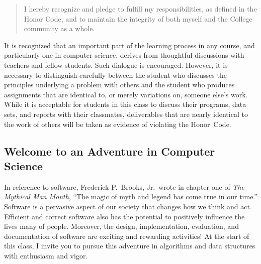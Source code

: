 \vspace*{-.1in}
\begin{quote}
  I hereby recognize and pledge to fulfill my responsibilities, as defined in the Honor Code, and to maintain the
  integrity of both myself and the College community as a whole.  
\end{quote}
\vspace*{-.15in}

\noindent It is recognized that an important part of the learning process in any course, and particularly one in
computer science, derives from thoughtful discussions with teachers and fellow students.  Such dialogue is encouraged.
However, it is necessary to distinguish carefully between the student who discusses the principles underlying a problem
with others and the student who produces assignments that are identical to, or merely variations on, someone else's
work.  While it is acceptable for students in this class to discuss their programs, data sets, and reports with their
classmates, deliverables that are nearly identical to the work of others will be taken as evidence of violating the
\mbox{Honor Code}.

\subsection*{Welcome to an Adventure in Computer Science}

In reference to software, Frederick P.\ Brooks, Jr.\ wrote in chapter one of {\em The Mythical Man Month}, ``The magic
of myth and legend has come true in our time.'' Software is a pervasive aspect of our society that changes how we think
and act.  Efficient and correct software also has the potential to positively influence the lives many of people.
Moreover, the design, implementation, evaluation, and documentation of software are exciting and rewarding activities!
At the start of this class, I invite you to pursue this adventure in algorithms and data structures with enthusiasm and
vigor.


